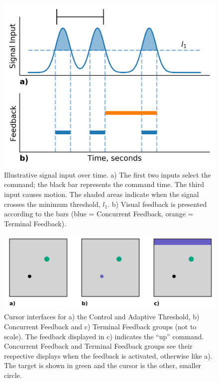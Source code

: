 \begin{figure}[hbt!]
	\centering
	\includegraphics[height=.4\textwidth]{figures/EMG/Figure1}
	\caption[Illustrative signal input over time]{Illustrative signal input over time.
		a) The first two inputs select the command; the black bar represents the command time.
		The third input causes motion.
		The shaded areas indicate when the signal crosses the minimum threshold, $l_1$.
		b) Visual feedback is presented according to the bars (blue = Concurrent Feedback, orange = Terminal Feedback).}
	\label{figure:label1}
\end{figure}

\begin{figure}[hbt!]
	\centering
	\includegraphics[width=.6125\textwidth]{figures/EMG/Figure2}
	\caption[Cursor interfaces]{Cursor interfaces for a) the Control and Adaptive Threshold, b) Concurrent Feedback and c) Terminal Feedback groups (not to scale).
		The feedback displayed in c) indicates the ``up'' command.
		Concurrent Feedback and Terminal Feedback groups see their respective displays when the feedback is activated, otherwise like a).
		The target is shown in green and the cursor is the other, smaller circle.}
	\label{figure:label2}
\end{figure}


